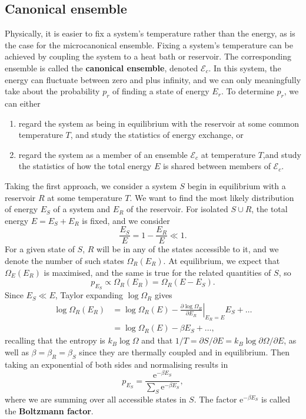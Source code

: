 \documentclass[letter-paper]{tufte-book}
\newcommand{\ex}{\mathrm{e}}
\newcommand\Def[1]{\textbf{#1}}
\begin{document}

\subsection{Canonical ensemble}

Physically, it is easier to fix a system's temperature rather than the energy,
as is the case for the microcanonical ensemble. Fixing a system's temperature
can be achieved by coupling the system to a heat bath or reservoir. The
corresponding ensemble is called the \Def{canonical ensemble}, denoted
$\mathcal{E}_c$. In this system, the energy can fluctuate between zero and plus
infinity, and we can only meaningfully take about the probability $p_r$ of
finding a state of energy $E_r$. To determine $p_r$, we can either
\begin{enumerate}
  \item regard the system as being in equilibrium with the reservoir at some
  common temperature $T$, and study the statistics of energy exchange, or
  \item regard the system as a member of an ensemble $\mathcal{E}_c$ at
  temperature $T$,and study the statistics of how the total energy $E$ is shared
  between members of $\mathcal{E}_c$.
\end{enumerate}

Taking the first approach, we consider a system $S$ begin in equilibrium with a
reservoir $R$ at some temperature $T$. We want to find the most likely
distribution of energy $E_S$ of a system and $E_R$ of the reservoir. For
isolated $S\cup R$, the total energy $E = E_S + E_R$ is fixed, and we consider
\begin{equation*}
  \frac{E_S}{E} = 1 - \frac{E_R}{E} \ll 1.
\end{equation*}
For a given state of $S$, $R$ will be in any of the states accessible to it, and
we denote the number of such states $\Omega_R(E_R)$. At equilibrium, we expect
that $\Omega_E(E_R)$ is maximised, and the same is true for the related
quantities of $S$, so
\begin{equation*}
  p_{E_S} \propto \Omega_R(E_R) = \Omega_R(E - E_S).
\end{equation*}
Since $E_S \ll E$, Taylor expanding $\log\Omega_R$ gives
\begin{align*}
  \log \Omega_R(E_R) &= \log\Omega_R(E) - \left.\frac{\partial \log\Omega_R}{\partial E_R}\right|_{E_R = E} E_S + \ldots\\
    &= \log\Omega_R(E) - \beta E_S + \ldots,
\end{align*}
recalling that the entropy is $k_B \log \Omega$ and that $1/T = \partial S /
\partial E = k_B \log \partial \Omega / \partial E$, as well as $\beta = \beta_R
= \beta_S$ since they are thermally coupled and in equilibrium. Then taking an
exponential of both sides and normalising results in
\begin{equation}
  p_{E_S} = \frac{\ex^{-\beta E_S}}{\sum_S \ex^{-\beta E_S}},
\end{equation}
where we are summing over all accessible states in $S$. The factor $\ex^{-\beta
E_S}$ is called the \Def{Boltzmann factor}.
\end{document}
